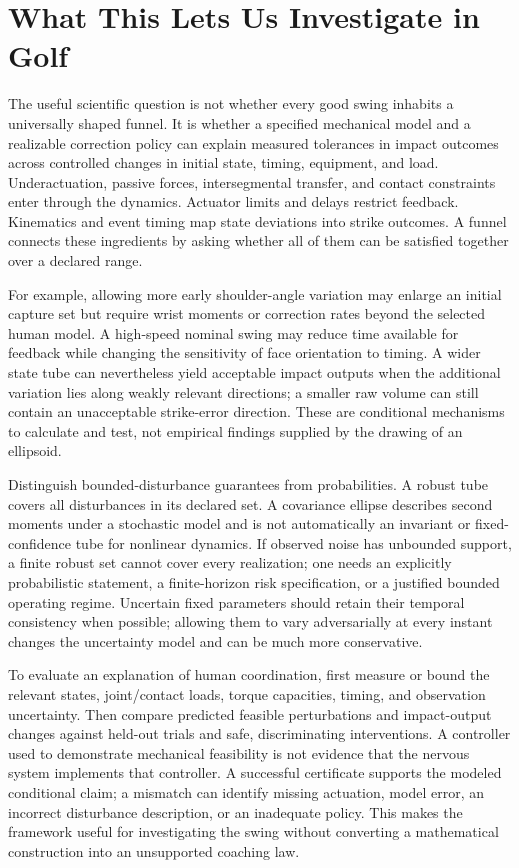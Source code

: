\documentclass[12pt, openany]{book}
\theoremstyle{plain}
\begin{document}
\section{What This Lets Us Investigate in Golf}

The useful scientific question is not whether every good swing inhabits a universally shaped funnel. It is whether a specified mechanical model and a realizable correction policy can explain measured tolerances in impact outcomes across controlled changes in initial state, timing, equipment, and load. Underactuation, passive forces, intersegmental transfer, and contact constraints enter through the dynamics. Actuator limits and delays restrict feedback. Kinematics and event timing map state deviations into strike outcomes. A funnel connects these ingredients by asking whether all of them can be satisfied together over a declared range.

For example, allowing more early shoulder-angle variation may enlarge an initial capture set but require wrist moments or correction rates beyond the selected human model. A high-speed nominal swing may reduce time available for feedback while changing the sensitivity of face orientation to timing. A wider state tube can nevertheless yield acceptable impact outputs when the additional variation lies along weakly relevant directions; a smaller raw volume can still contain an unacceptable strike-error direction. These are conditional mechanisms to calculate and test, not empirical findings supplied by the drawing of an ellipsoid.

Distinguish bounded-disturbance guarantees from probabilities. A robust tube covers all disturbances in its declared set. A covariance ellipse describes second moments under a stochastic model and is not automatically an invariant or fixed-confidence tube for nonlinear dynamics. If observed noise has unbounded support, a finite robust set cannot cover every realization; one needs an explicitly probabilistic statement, a finite-horizon risk specification, or a justified bounded operating regime. Uncertain fixed parameters should retain their temporal consistency when possible; allowing them to vary adversarially at every instant changes the uncertainty model and can be much more conservative.

To evaluate an explanation of human coordination, first measure or bound the relevant states, joint/contact loads, torque capacities, timing, and observation uncertainty. Then compare predicted feasible perturbations and impact-output changes against held-out trials and safe, discriminating interventions. A controller used to demonstrate mechanical feasibility is not evidence that the nervous system implements that controller. A successful certificate supports the modeled conditional claim; a mismatch can identify missing actuation, model error, an incorrect disturbance description, or an inadequate policy. This makes the framework useful for investigating the swing without converting a mathematical construction into an unsupported coaching law.
\end{document}
